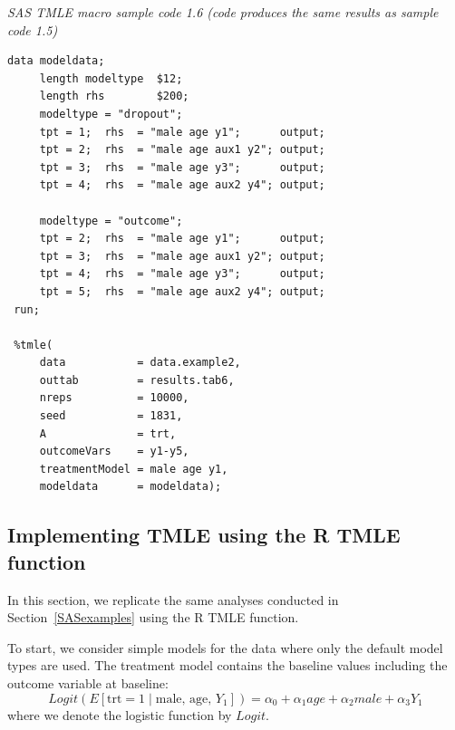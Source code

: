 \documentclass[10pt]{article}
\renewcommand{\baselinestretch}{1.3}
\begin{document}
\begin{minipage}{\textwidth}
\renewcommand{\baselinestretch}{1.0}\selectfont%
\begin{minipage}[l]{5.6in}
\normalsize\em%
SAS TMLE macro sample code 1.6 (code produces the same results as sample code 1.5)
\end{minipage}\vspace{-0.08in}
\begin{Verbatim}[baselinestretch=1.0, fontsize=\small, frame=single, commandchars=\\\{\}]
 data modeldata;
     length modeltype  $12;
     length rhs        $200;
     modeltype = "dropout";  
     tpt = 1;  rhs  = "male age y1";      output;
     tpt = 2;  rhs  = "male age aux1 y2"; output;
     tpt = 3;  rhs  = "male age y3";      output;
     tpt = 4;  rhs  = "male age aux2 y4"; output;
     
     modeltype = "outcome";  
     tpt = 2;  rhs  = "male age y1";      output;
     tpt = 3;  rhs  = "male age aux1 y2"; output;
     tpt = 4;  rhs  = "male age y3";      output;
     tpt = 5;  rhs  = "male age aux2 y4"; output;
 run;
     
 %tmle(
     data           = data.example2,
     outtab         = results.tab6,
     nreps          = 10000,
     seed           = 1831,
     A              = trt,
     outcomeVars    = y1-y5,
     treatmentModel = male age y1,
     modeldata      = modeldata);
\end{Verbatim}
\end{minipage}



\vspace{0.2in}
\subsection*{Implementing TMLE using the R TMLE function}

In this section, we replicate the same analyses conducted in Section~\ref{SASexamples} using the R TMLE function.

To start, we consider simple models for the data where only the default model types are used.  The treatment model contains the baseline values including the outcome variable at baseline:
$$ Logit( E[ \mbox{trt} = 1 \mid  \mbox{male, age, } Y_1 ] ) =  \alpha_0 + \alpha_1 age + \alpha_2 male + \alpha_3 Y_1 $$
where we denote the logistic function by $Logit$.
\end{document}
